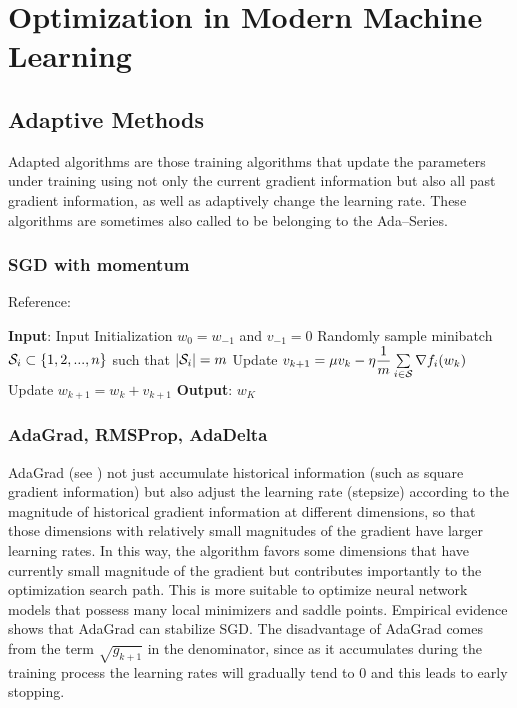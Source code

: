 \chapter{Optimization in Modern Machine Learning}
\label{Ch:OptimizationModernML}

\section{Adaptive Methods}
\label{Ch:OptimizationModernML:Ada}

Adapted algorithms are those training algorithms that update the parameters 
under training using not only the current gradient information but also all past gradient information, as well as 
adaptively change the learning rate. These algorithms are sometimes also called to be belonging to the Ada--Series. 


\subsection{SGD with momentum}

Reference: \cite{HintonEtAlImportanceMomentumDeepLearningICML2013}

\begin{algorithm}[H]
\caption{SGD with momentum ($=$ stochastic heavy ball method)}
\label{Alg:SGDMomentum}
\begin{algorithmic}[1]
\STATE \textbf{Input}: Input Initialization $w_0=w_{-1}$ and $v_{-1}=0$
    \STATE Randomly sample minibatch $\mathcal S_i\subset\{1,2,...,n\}$ such that $|\mathcal S_i|=m$
    \STATE Update $v_{k+1}=\mu v_k-\eta \dfrac{1}{m}\sum\limits_{i\in \mathcal S}\nabla f_i(w_k)$
    \STATE Update $w_{k+1}=w_k+v_{k+1}$
\ENDFOR
\STATE \textbf{Output}: $w_K$
\end{algorithmic}
\end{algorithm}


\subsection{AdaGrad, RMSProp, AdaDelta}

AdaGrad (see \cite{duchi2011adaptive}) not just accumulate historical information (such as square gradient information) but also adjust the learning rate 
(stepsize) according to the magnitude of historical gradient information at different dimensions, so that 
those dimensions with relatively small magnitudes of the gradient have larger learning rates. 
In this way, the algorithm favors some dimensions that have currently small magnitude of the gradient 
but contributes importantly to the optimization search path. This is more suitable to optimize 
neural network models that possess many local minimizers and saddle points. Empirical evidence shows that 
AdaGrad can stabilize SGD. The disadvantage of AdaGrad comes from the term $\sqrt{g_{k+1}}$
in the denominator, since as it accumulates during the training process the learning rates will gradually tend to $0$
and this leads to early stopping.

